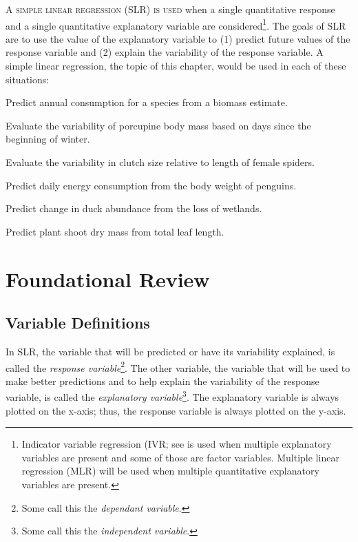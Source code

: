 \documentclass[10pt,openany]{book}\usepackage[]{graphicx}\usepackage[]{color}
\begin{document}
\lettrine{A}{ simple linear regression (SLR) is used} when a single quantitative response and a single quantitative explanatory variable are considered\footnote{Indicator variable regression (IVR; see  is used when multiple explanatory variables are present and some of those are factor variables.  Multiple linear regression (MLR) will be used when multiple quantitative explanatory variables are present.}.  The goals of SLR are to use the value of the explanatory variable to (1) predict future values of the response variable and (2) explain the variability of the response variable.  A simple linear regression, the topic of this chapter, would be used in each of these situations:
\begin{Enumerate}
  \item Predict annual consumption for a species from a biomass estimate.
  \item Evaluate the variability of porcupine body mass based on days since the beginning of winter.
  \item Evaluate the variability in clutch size relative to length of female spiders.
  \item Predict daily energy consumption from the body weight of penguins.
  \item Predict change in duck abundance from the loss of wetlands.
  \item Predict plant shoot dry mass from total leaf length.
\end{Enumerate}


\section{Foundational Review}
\subsection{Variable Definitions}
In SLR, the variable that will be predicted or have its variability explained, is called the \emph{response variable}\footnote{Some call this the \emph{dependant variable}.}.  The other variable, the variable that will be used to make better predictions and to help explain the variability of the response variable, is called the \emph{explanatory variable}\footnote{Some call this the \emph{independent variable}.}.  The explanatory variable is always plotted on the x-axis; thus, the response variable is always plotted on the y-axis.
\end{document}
